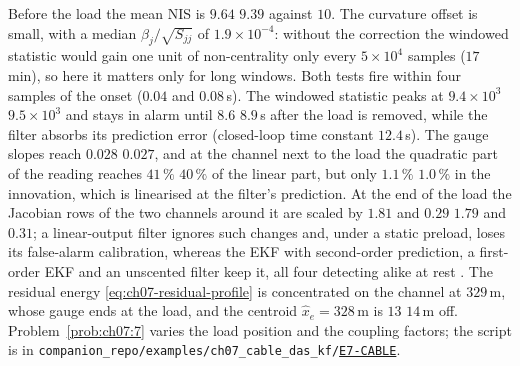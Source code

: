 \documentclass[graybox,envcountchap]{style/SNmono}
\newcommand{\repopath}[1]{\texttt{#1}}
\providecommand{\DIFadd}[1]{{\protect\color{blue} #1}} %
\providecommand{\DIFdel}[1]{{\protect\color{red} #1}} %
\providecommand{\DIFaddbegin}{} %
\providecommand{\DIFaddend}{} %
\providecommand{\DIFdelbegin}{} %
\providecommand{\DIFdelend}{} %
\DeclareRobustCommand{\RtwoDel}[1]{{\color{red}%
  \renewcommand{\DIFadd}[1]{##1}\renewcommand{\DIFdel}[1]{##1}%
  #1}}
\DeclareRobustCommand{\RtwoAdd}[1]{{\color{blue}#1}}
\DeclareRobustCommand{\codeentry}[1]{\hyperref[code:#1]{\texttt{#1}}}
\begin{document}
\begin{example}
Before the load the mean NIS is \DIFdelbegin \DIFdel{$9.64$ }\DIFdelend \DIFaddbegin \DIFadd{$9.39$ }\DIFaddend against $10$. The curvature offset is small, with a median $\beta_j/\sqrt{S_{jj}}$ of $1.9\times10^{-4}$: without the correction the windowed statistic would gain one unit of non-centrality only every $5\times10^{4}$ samples ($17$\,min), so here it matters only for long windows. Both tests fire within four samples of the onset ($0.04$ and $0.08$\,s). The windowed statistic peaks at \DIFdelbegin \DIFdel{$9.4\times10^{3}$ }\DIFdelend \DIFaddbegin \DIFadd{$9.5\times10^{3}$ }\DIFaddend and stays in alarm until \DIFdelbegin \DIFdel{$8.6$}\DIFdelend \DIFaddbegin \DIFadd{$8.9$}\DIFaddend \,s after the load is removed, while the filter absorbs its prediction error (closed-loop time constant $12.4$\,s). The gauge slopes reach \DIFdelbegin \DIFdel{$0.028$}\DIFdelend \DIFaddbegin \DIFadd{$0.027$}\DIFaddend , and at the channel next to the load the quadratic part of the reading reaches \DIFdelbegin \DIFdel{$41\,\%$ }\DIFdelend \DIFaddbegin \DIFadd{$40\,\%$ }\DIFaddend of the linear part, but only \DIFdelbegin \DIFdel{$1.1\,\%$ }\DIFdelend \DIFaddbegin \DIFadd{$1.0\,\%$ }\DIFaddend in the innovation, which is linearised at the filter's prediction. At the end of the load the Jacobian rows of the two channels around it are scaled by \DIFdelbegin \DIFdel{$1.81$ and $0.29$}\DIFdelend \DIFaddbegin \DIFadd{$1.79$ and $0.31$}\DIFaddend ; a linear-output filter \cite{fioravanti_cable_med_2026} ignores such changes and, under a static preload, loses its false-alarm calibration, whereas the EKF with second-order prediction, a first-order EKF and an unscented filter keep it, all four detecting alike at rest \cite{oliva_quadratic_ejc_2026}. The residual energy \eqref{eq:ch07-residual-profile} is concentrated on the channel at $329$\,m, whose gauge ends at the load, and the centroid $\hat x_e=328$\,m is \DIFdelbegin \DIFdel{$13$}\DIFdelend \DIFaddbegin \DIFadd{$14$}\DIFaddend \,m off. Problem~\ref{prob:ch07:7} varies the load position and the coupling factors; the script is in \RtwoDel{\repopath{companion\_\allowbreak repo/\allowbreak examples/\allowbreak ch07\_\allowbreak cable\_\allowbreak das\_\allowbreak kf/\allowbreak }}\RtwoAdd{\codeentry{E7-CABLE}}.
\end{example}
\end{document}
